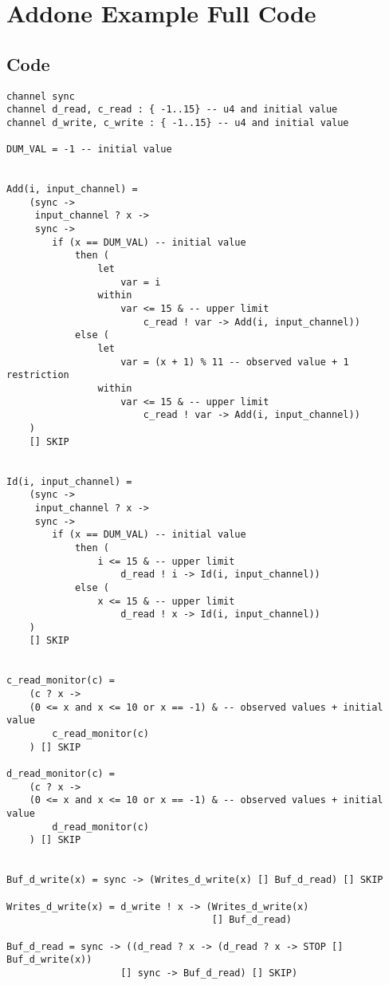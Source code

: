 \chapter{Addone Example Full \cspm Code}
\label{app:addone}
\section*{\cspm{} Code}
\begin{verbatim}
channel sync
channel d_read, c_read : { -1..15} -- u4 and initial value
channel d_write, c_write : { -1..15} -- u4 and initial value

DUM_VAL = -1 -- initial value


Add(i, input_channel) =
    (sync ->
     input_channel ? x ->
     sync ->
        if (x == DUM_VAL) -- initial value
            then (
                let
                    var = i
                within
                    var <= 15 & -- upper limit
                        c_read ! var -> Add(i, input_channel))
            else (
                let
                    var = (x + 1) % 11 -- observed value + 1 restriction
                within
                    var <= 15 & -- upper limit
                        c_read ! var -> Add(i, input_channel))
    )
    [] SKIP


Id(i, input_channel) =
    (sync ->
     input_channel ? x ->
     sync ->
        if (x == DUM_VAL) -- initial value
            then (
                i <= 15 & -- upper limit
                    d_read ! i -> Id(i, input_channel))
            else (
                x <= 15 & -- upper limit
                    d_read ! x -> Id(i, input_channel))
    )
    [] SKIP


c_read_monitor(c) =
    (c ? x ->
    (0 <= x and x <= 10 or x == -1) & -- observed values + initial value
        c_read_monitor(c)
    ) [] SKIP

d_read_monitor(c) =
    (c ? x ->
    (0 <= x and x <= 10 or x == -1) & -- observed values + initial value
        d_read_monitor(c)
    ) [] SKIP


Buf_d_write(x) = sync -> (Writes_d_write(x) [] Buf_d_read) [] SKIP

Writes_d_write(x) = d_write ! x -> (Writes_d_write(x)
                                    [] Buf_d_read)

Buf_d_read = sync -> ((d_read ? x -> (d_read ? x -> STOP [] Buf_d_write(x))
                    [] sync -> Buf_d_read) [] SKIP)




\end{verbatim}
